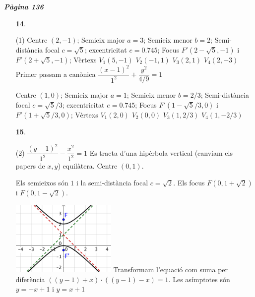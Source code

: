 \documentclass[a4paper, pdf, twoside]{book}
\begin{document}
\begin{multicols}{2}

{\textbf{\em Pàgina 136}} \hrulefill
\begin{enumerate}
\vspace{0.25cm}



 \item[\fontfamily{phv}\selectfont\color{blue}\textbf{14}. ] 
 \begin{tasks}[column-sep=1em, item-indent=1.3333em](1)
	 \task* Centre $(2,-1)$; Semieix major $a=3$; Semieix menor $b=2$; Semi-distància focal $c=\sqrt {5}$; excentricitat $e=0.745$; Focus $F'(2-\sqrt {5},-1)$ i $F'(2+\sqrt {5},-1)$; Vèrtexs $V_1(5,-1)$ \; $V_2(-1,1)$ \; $V_3(2,1)$ \; $V_4(2,-3)$
	 \task* Primer passam a canònica $\dfrac {(x-1)^2}{1^2}+\dfrac {y^2}{4/9}=1$\par Centre $(1,0)$; Semieix major $a=1$; Semieix menor $b=2/3$; Semi-distància focal $c=\sqrt {5}/3$; excentricitat $e=0.745$; Focus $F'(1-\sqrt {5}/3,0)$ i $F'(1+\sqrt {5}/3,0)$; Vèrtexs $V_1(2,0)$ \; $V_2(0,0)$ \; $V_3(1,2/3)$ \; $V_4(1,-2/3)$
\end{tasks}
 \end{enumerate}
\begin{enumerate}
\vspace{0.25cm}



 \item[\fontfamily{phv}\selectfont\color{blue}\textbf{15}. ] 
 \begin{tasks}[column-sep=1em, item-indent=1.3333em](2)
	 \task* $\dfrac {(y-1)^2}{1^2}-\dfrac {x^2}{1^2}=1$
	 \task* Es tracta d'una hipèrbola vertical (canviam els papers de $x,y$) equilàtera. Centre $(0,1)$.\par Els semieixos són $1$ i la semi-distància focal $c=\sqrt {2}$. Els focus $F(0,1+\sqrt {2})$ i $F(0,1-\sqrt {2})$.\par \includegraphics [width=0.4\textwidth ]{img-sol/t10-13}
	 \task* Transformam l'equació com suma per diferència $\left ( (y-1) + x \right ) \cdot \left ( (y-1) - x \right )=1$. Les asímptotes són $y=-x+1$ i $y=x+1$ 
\end{tasks}
\vspace{0.25cm}



\end{enumerate}
\end{multicols}
\end{document}
